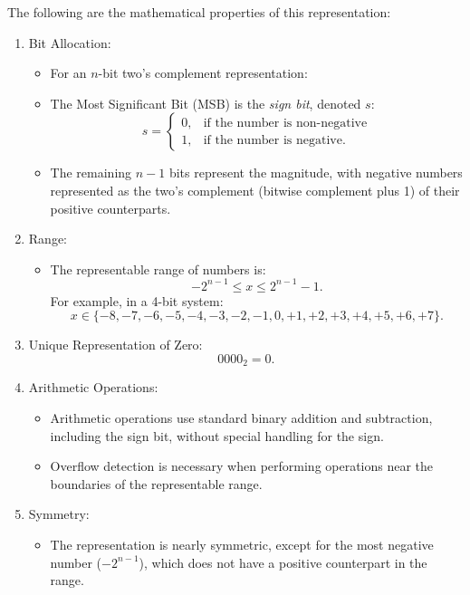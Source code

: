 The following are the mathematical properties of this representation:

\begin{enumerate}[left=1cm]
    \item Bit Allocation:
    \begin{itemize}
        \item For an \( n \)-bit two's complement representation:
        \item The Most Significant Bit (MSB) is the \textit{sign bit}, denoted \( s \):
       \[
       s = 
       \begin{cases} 
       0, & \text{if the number is non-negative} \\
       1, & \text{if the number is negative.}
       \end{cases}
       \]
        \item The remaining \( n-1 \) bits represent the magnitude, with negative numbers represented as the two's complement (bitwise complement plus 1) of their positive counterparts.
    \end{itemize}

    \item Range:
    \begin{itemize}
        \item The representable range of numbers is:
     \[
     -2^{n-1} \leq x \leq 2^{n-1} - 1.
     \]
     For example, in a 4-bit system:
     \[
     x \in \{-8, -7, -6, -5, -4, -3, -2, -1, 0, +1, +2, +3, +4, +5, +6, +7\}.
     \]
     \end{itemize}

    \item Unique Representation of Zero:
     \[
     0000_2 = 0.
     \]

    \item Arithmetic Operations:
    \begin{itemize}
        \item Arithmetic operations use standard binary addition and subtraction, including the sign bit, without special handling for the sign.
        \item Overflow detection is necessary when performing operations near the boundaries of the representable range.
    \end{itemize}

    \item Symmetry:
    \begin{itemize}
        \item The representation is nearly symmetric, except for the most negative number (\( -2^{n-1} \)), which does not have a positive counterpart in the range.
    \end{itemize}


\end{enumerate}

